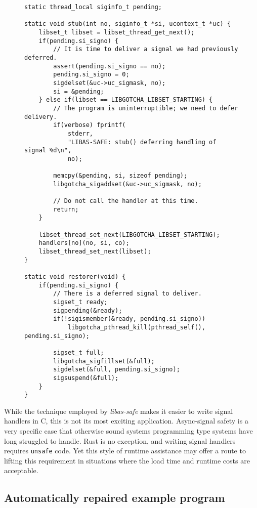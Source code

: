 \begin{figure}
\begin{lstlisting}[label=lst:assafe_helpers,caption=\textit{libas-safe}'s signal handler wrapper and control library callback]
static thread_local siginfo_t pending;

static void stub(int no, siginfo_t *si, ucontext_t *uc) {
	libset_t libset = libset_thread_get_next();
	if(pending.si_signo) {
		// It is time to deliver a signal we had previously deferred.
		assert(pending.si_signo == no);
		pending.si_signo = 0;
		sigdelset(&uc->uc_sigmask, no);
		si = &pending;
	} else if(libset == LIBGOTCHA_LIBSET_STARTING) {
		// The program is uninterruptible; we need to defer delivery.
		if(verbose) fprintf(
			stderr,
			"LIBAS-SAFE: stub() deferring handling of signal %d\n",
			no);

		memcpy(&pending, si, sizeof pending);
		libgotcha_sigaddset(&uc->uc_sigmask, no);

		// Do not call the handler at this time.
		return;
	}

	libset_thread_set_next(LIBGOTCHA_LIBSET_STARTING);
	handlers[no](no, si, co);
	libset_thread_set_next(libset);
}

static void restorer(void) {
	if(pending.si_signo) {
		// There is a deferred signal to deliver.
		sigset_t ready;
		sigpending(&ready);
		if(!sigismember(&ready, pending.si_signo))
			libgotcha_pthread_kill(pthread_self(), pending.si_signo);

		sigset_t full;
		libgotcha_sigfillset(&full);
		sigdelset(&full, pending.si_signo);
		sigsuspend(&full);
	}
}
\end{lstlisting}
\end{figure}

While the technique employed by \textit{libas-safe} makes it easier to write signal
handlers in C, this is not its most exciting application.  Async-signal safety is a
very specific case that otherwise sound systems programming type systems have long
struggled to handle.  Rust is no exception, and writing signal handlers requires
\texttt{unsafe} code.  Yet this style of runtime assistance may offer a route to
lifting this requirement in situations where the load time and runtime costs are
acceptable.


\subsection{Automatically repaired example program}


